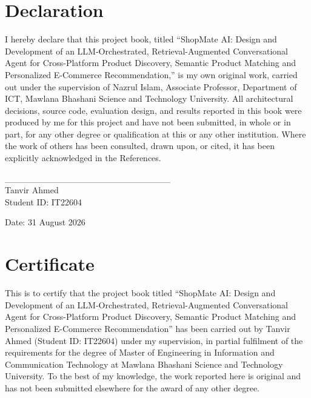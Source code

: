 \documentclass[12pt,a4paper]{report}
\begin{document}

\chapter*{Declaration}
I hereby declare that this project book, titled ``ShopMate AI: Design and Development of an
LLM-Orchestrated, Retrieval-Augmented Conversational Agent for Cross-Platform Product Discovery, Semantic
Product Matching and Personalized E-Commerce Recommendation,'' is my own original work, carried out under
the supervision of Nazrul Islam, Associate Professor, Department of ICT, Mawlana Bhashani Science and
Technology University. All architectural decisions, source code, evaluation design, and results reported
in this book were produced by me for this project and have not been submitted, in whole or in part, for
any other degree or qualification at this or any other institution. Where the work of others has been
consulted, drawn upon, or cited, it has been explicitly acknowledged in the References.

\vspace{3cm}
\noindent
\begin{minipage}{0.48\textwidth}
\_\_\_\_\_\_\_\_\_\_\_\_\_\_\_\_\_\_\_\_\_\_\_\_\_\_\\
Tanvir Ahmed\\
Student ID: IT22604
\end{minipage}%
\hfill
\begin{minipage}{0.42\textwidth}
\raggedleft
Date: 31 August 2026
\end{minipage}

\chapter*{Certificate}
This is to certify that the project book titled ``ShopMate AI: Design and Development of an
LLM-Orchestrated, Retrieval-Augmented Conversational Agent for Cross-Platform Product Discovery, Semantic
Product Matching and Personalized E-Commerce Recommendation'' has been carried out by Tanvir Ahmed
(Student ID: IT22604) under my supervision, in partial fulfilment of the requirements for the degree of
Master of Engineering in Information and Communication Technology at Mawlana Bhashani Science and
Technology University. To the best of my knowledge, the work reported here is original and has not been
submitted elsewhere for the award of any other degree.
\end{document}
